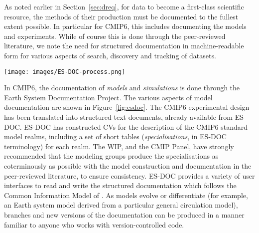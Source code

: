 \documentclass[gmd,manuscript]{copernicus}
\newcommand{\bibref}[1] { \cite{ref:#1}}
\newcommand{\figref}[1] {\mbox{Figure   \ref{fig:#1}}}
\newcommand{\secref}[1] {\mbox{Section  \ref{sec:#1}}}
\begin{document}
As noted earlier in \secref{dreq}, for data to become a first-class
scientific resource, the methods of their production must be documented
to the fullest extent possible. In particular for CMIP6, this includes
documenting the models and experiments. While of course this is done
through the peer-reviewed literature, we note the need for structured
documentation in machine-readable form for various aspects of search,
discovery and tracking of datasets.


\begin{figure*}
  \begin{center}
    \texttt{[image: images/ES-DOC-process.png]}
  \end{center}
  \caption{Flowchart of ES-DOC documentation process, delineating
    sequence of events and indicating the parties responsible for
    producing the documentation. Figure courtesy Eric Guilyardi and
    Mark Greenslade.}
  \label{fig:esdoc}
\end{figure*}

In CMIP6, the documentation of \emph{models} and \emph{simulations} is
done through the Earth System Documentation
\citep[\href{https://goo.gl/WNwKD9}{ES-DOC},][]{ref:guilyardietal2013}
Project. The various aspects of model documentation are shown in
\figref{esdoc}. The CMIP6 experimental design has been translated into
structured text documents, already available from ES-DOC. ES-DOC has
constructed CVs for the description of the CMIP6 standard model
realms, including a set of short tables (\emph{specialisations}, in
ES-DOC terminology) for each realm. The WIP, and the CMIP Panel, have
strongly recommended that the modeling groups produce the
specialisations as coterminously as possible with the model
construction and documentation in the peer-reviewed literature, to
ensure consistency. ES-DOC provides a variety of user interfaces to
read and write the structured documentation which follows the Common
Information Model of \bibref{lawrenceetal2012}. As models evolve or
differentiate (for example, an Earth system model derived from a
particular general circulation model), branches and new versions of
the documentation can be produced in a manner familiar to anyone who
works with version-controlled code.
\end{document}
